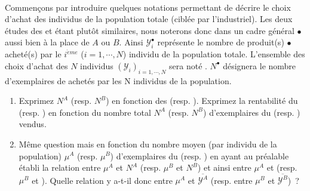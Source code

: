 \documentclass[10pt]{report}
\begin{document}
\newpage\begin{exercice}${ }$


Commençons par introduire quelques notations permettant de décrire le choix d'achat des individus de la population totale (ciblée par l'industriel). Les deux études des  et  étant plutôt similaires, nous noterons donc dans un cadre général  $\bullet$ aussi bien à la place de $A$ ou $B$. Ainsi  
$\mathcal{Y}^{\bullet}_i$ représente le nombre de produit(s) $\bullet$ acheté(s) par le $i^{\grave eme}$ ($i=1,\cdots,N$) individu de la population totale. L'ensemble des choix d'achat des $N$ individus $\left(\mathcal{Y}_i\right)_{i=1,\cdots,N}$ sera noté \POP. $N^{\bullet}$ désignera le nombre d'exemplaires de \PR{$\bullet$} achetés par les N individus de la population. 

\begin{enumerate}
\item Exprimez $N^A$ (resp. $N^B$) en fonction des  \POP[A] (resp. \POP[B]). Exprimez la rentabilité du  (resp. ) en fonction du nombre total $N^A$ (resp. $N^B$) d'exemplaires du  (resp. ) vendus.

\item Même question mais en fonction du nombre moyen (par individu de la population) $\mu^A$ (resp. $\mu^B$) d'exemplaires du  (resp. ) en ayant au préalable établi la relation entre $\mu^A$ et $N^A$ (resp. $\mu^B$ et $N^B$) et ainsi entre $\mu^A$ et \POP[A] (resp. $\mu^B$ et \POP[B]). Quelle relation y a-t-il donc entre $\mu^A$ et $\overline{\mathcal{Y}^A}$ (resp. entre $\mu^B$ et $\overline{\mathcal{Y}^B}$)~?\\
\centerline{}


\end{enumerate}
\end{exercice}
\end{document}
